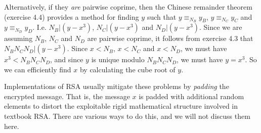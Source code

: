 \documentclass{article}
\theoremstyle{plain}
\begin{document}
Alternatively, if they \emph{are} pairwise coprime, then the Chinese remainder theorem (exercise 4.4) provides a method for finding $y$ such that $y \equiv_{N_B} y_B$, $y \equiv_{N_C} y_C$ and $y \equiv_{N_D} y_D$. I.e. $N_B|(y - x^3)$, $N_C|(y - x^3)$ and $N_D|(y - x^3)$.  Since we are assuming $N_B$, $N_C$ and $N_D$ are pairwise coprime, it follows from exercise 4.3 that $N_BN_CN_D|(y-x^3)$. Since $x< N_B$, $x<N_C$ and $x< N_D$, we must have $x^3 < N_BN_CN_D$, and since $y$ is unique modulo $N_BN_CN_D$, we must have $y = x^3$. So we can efficiently find $x$ by calculating the cube root of $y$.

Implementations of RSA usually mitigate these problems by \emph{padding} the encrypted message. That is, the message $x$ is padded with additional random elements to distort the exploitable rigid mathematical structure involved in textbook RSA. There are various ways to do this, and we will not discuss them here.   
\end{document}

